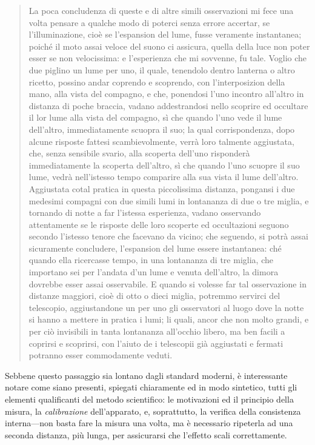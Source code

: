 \begin{quotation}
  La poca concludenza di queste e di altre simili osservazioni mi fece
  una volta pensare a qualche modo di poterci senza errore accertar, se
  l'illuminazione, cioè se l'espansion del lume, fusse veramente instantanea;
  poiché il moto assai veloce del suono ci assicura, quella della luce
  non poter esser se non velocissima: e l'esperienza che mi sovvenne, fu tale.
  Voglio che due piglino un lume per uno, il quale, tenendolo dentro lanterna
  o altro ricetto, possino andar coprendo e scoprendo, con l'interposizion
  della mano, alla vista del compagno, e che, ponendosi l'uno incontro
  all'altro in distanza di poche braccia, vadano addestrandosi nello scoprire
  ed occultare il lor lume alla vista del compagno, sì che quando l'uno
  vede il lume dell'altro, immediatamente scuopra il suo; la qual corrispondenza,
  dopo alcune risposte fattesi scambievolmente, verrà loro talmente aggiustata,
  che, senza sensibile svario, alla scoperta dell'uno risponderà immediatamente
  la scoperta dell'altro, sì che quando l'uno scuopre il suo lume, vedrà
  nell'istesso tempo comparire alla sua vista il lume dell'altro. Aggiustata cotal
  pratica in questa piccolissima distanza, pongansi i due medesimi compagni con due simili
  lumi in lontananza di due o tre miglia, e tornando di notte a far l'istessa esperienza,
  vadano osservando attentamente se le risposte delle loro scoperte ed
  occultazioni seguono secondo l'istesso tenore che facevano da vicino; che
  seguendo, si potrà assai sicuramente concludere, l'espansion del lume essere
  instantanea: ché quando ella ricercasse tempo, in una lontananza di tre
  miglia, che importano sei per l'andata d'un lume e venuta dell'altro,
  la dimora dovrebbe esser assai osservabile. E quando si volesse far tal osservazione
  in distanze maggiori, cioè di otto o dieci miglia, potremmo servirci del telescopio,
  aggiustandone un per uno gli osservatori al luogo dove la notte si hanno a mettere
  in pratica i lumi; li quali, ancor che non molto grandi, e per ciò
  invisibili in tanta lontananza all'occhio libero, ma ben facili a coprirsi
  e scoprirsi, con l'aiuto de i telescopii già aggiustati e fermati potranno
  esser commodamente veduti.
\end{quotation}

Sebbene questo passaggio sia lontano dagli standard moderni, è interessante
notare come siano presenti, spiegati chiaramente ed in modo sintetico, tutti gli
elementi qualificanti del metodo scientifico: le motivazioni ed il principio della
misura, la \emph{calibrazione} dell'apparato, e, soprattutto, la verifica della
consistenza interna---non basta fare la misura una volta, ma è necessario
ripeterla ad una seconda distanza, più lunga, per assicurarsi che l'effetto
scali correttamente.

